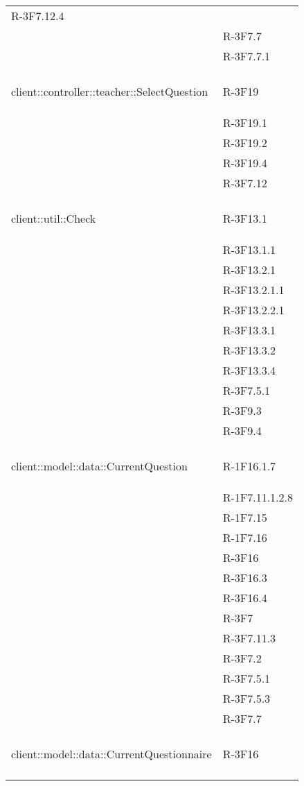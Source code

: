 \begin{longtable}{l p{3cm}}
	R-3F7.12.4 \tabularnewline &
	
	R-3F7.7 \tabularnewline &
	
	R-3F7.7.1 \tabularnewline &\tabularnewline
	\hline
	\hypertarget{client::controller::teacher::SelectQuestion}{client::controller::teacher::SelectQuestion} & R-3F19 \tabularnewline &
	
	R-3F19.1 \tabularnewline &
	
	R-3F19.2 \tabularnewline &
	
	R-3F19.4 \tabularnewline &
	
	R-3F7.12 \tabularnewline &\tabularnewline
	\hline
	\hypertarget{client::util::Check}{client::util::Check} & R-3F13.1 \tabularnewline &
	
	R-3F13.1.1 \tabularnewline &
	
	R-3F13.2.1 \tabularnewline &
	
	R-3F13.2.1.1 \tabularnewline &
	
	R-3F13.2.2.1 \tabularnewline &
	
	R-3F13.3.1 \tabularnewline &
	
	R-3F13.3.2 \tabularnewline &
	
	R-3F13.3.4 \tabularnewline &
	
	R-3F7.5.1 \tabularnewline &
	
	R-3F9.3 \tabularnewline &
	
	R-3F9.4 \tabularnewline &\tabularnewline
	\hline
	\hypertarget{client::model::data::CurrentQuestion}{client::model::data::CurrentQuestion} & R-1F16.1.7 \tabularnewline &
	
	R-1F7.11.1.2.8 \tabularnewline &
	
	R-1F7.15 \tabularnewline &
	
	R-1F7.16 \tabularnewline &
	
	R-3F16 \tabularnewline &
	
	R-3F16.3 \tabularnewline &
	
	R-3F16.4 \tabularnewline &
	
	R-3F7 \tabularnewline &
	
	R-3F7.11.3 \tabularnewline &
	
	R-3F7.2 \tabularnewline &
	
	R-3F7.5.1 \tabularnewline &
	
	R-3F7.5.3 \tabularnewline &
	
	R-3F7.7 \tabularnewline &\tabularnewline
	\hline
	\hypertarget{client::model::data::CurrentQuestionnaire}{client::model::data::CurrentQuestionnaire} & R-3F16 \tabularnewline &
	

\end{longtable}

